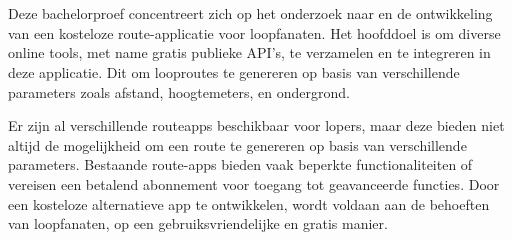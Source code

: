 
%
%
%
%
%

%




\chapter*{}
Deze bachelorproef concentreert zich op het onderzoek naar en de ontwikkeling van een kosteloze route-applicatie voor loopfanaten. 
Het hoofddoel is om diverse online tools, met name gratis publieke API's, te verzamelen en te integreren in deze applicatie. 
Dit om looproutes te genereren op basis van verschillende parameters zoals afstand, hoogtemeters, en ondergrond.

Er zijn al verschillende routeapps beschikbaar voor lopers, maar deze bieden niet altijd de mogelijkheid om een route te genereren op basis van verschillende parameters. 
Bestaande route-apps bieden vaak beperkte functionaliteiten of vereisen een betalend abonnement voor toegang tot geavanceerde functies. 
Door een kosteloze alternatieve app te ontwikkelen, wordt voldaan aan de behoeften van loopfanaten, op een gebruiksvriendelijke en gratis manier.

